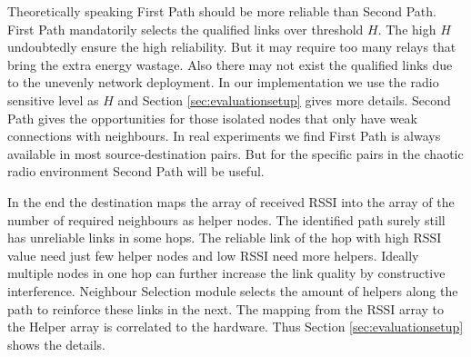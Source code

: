 \documentclass[conference]{IEEEtran}
\begin{document}

Theoretically speaking First Path should be more reliable than Second Path. First Path mandatorily selects the qualified links over threshold $H$. The high $H$ undoubtedly ensure the high reliability. But it may require too many relays that bring the extra energy wastage. Also there may not exist the qualified links due to the unevenly network deployment. In our implementation we use the radio sensitive level as $H$ and Section \ref{sec:evaluationsetup} gives more details. Second Path gives the opportunities for those isolated nodes that only have weak connections with neighbours. In real experiments we find First Path is always available in most source-destination pairs. But for the specific pairs in the chaotic radio environment Second Path will be useful.

In the end the destination maps the array of received RSSI into the array of the number of required neighbours as helper nodes. The identified path surely still has unreliable links in some hops. The reliable link of the hop with high RSSI value need just few helper nodes and low RSSI need more helpers. Ideally multiple nodes in one hop can further increase the link quality by constructive interference. Neighbour Selection module selects the amount of helpers along the path to reinforce these links in the next. The mapping from the RSSI array to the Helper array is correlated to the hardware. Thus Section \ref{sec:evaluationsetup} shows the details. %
\end{document}
